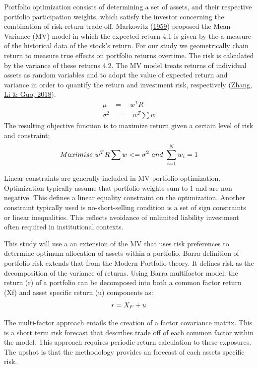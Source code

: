 \documentclass[12pt,preprint, authoryear]{elsarticle}
\numberwithin{equation}{section}
\numberwithin{figure}{section}
\numberwithin{table}{section}
\begin{document}
Portfolio optimization consists of determining a set of assets, and
their respective portfolio participation weights, which satisfy the
investor concerning the combination of risk-return trade-off. Markowitz
(\protect\hyperlink{ref-markowitz1959portfolio}{1959}) proposed the
Mean-Variance (MV) model in which the expected return 4.1 is given by
the a measure of the historical data of the stock's return. For our
study we geometrically chain return to measure true effects on portfolio
returns overtime. The risk is calculated by the variance of these
returns 4.2. The MV model treats returns of individual assets as random
variables and to adopt the value of expected return and variance in
order to quantify the return and investment risk, respectively
(\protect\hyperlink{ref-zhang2018portfolio}{Zhang, Li \& Guo, 2018}).
\begin{align}
 \mu \quad = \quad w^TR \\ 
\sigma^2 \quad  = \quad w^T\sum 
w\end{align} The resulting objective function is to maximize return
given a certain level of risk and constraint; \begin{align}
Maximise \ w^TR \sum w<=\sigma^2\ and\ \sum_{i = 1}^{N}w{_i}=1 \notag
\end{align}

Linear constraints are generally included in MV portfolio optimization.
Optimization typically assume that portfolio weights sum to 1 and are
non negative. This defines a linear equality constraint on the
optimization. Another constraint typically used is no-short-selling
condition is a set of sign constraints or linear inequalities. This
reflects avoidance of unlimited liability investment often required in
institutional contexts.

This study will use a an extension of the MV that uses risk preferences
to determine optimum allocation of assets within a portfolio. Barra
definition of portfolio risk extends that from the Modern Portfolio
theory. It defines risk as the decomposition of the variance of returns.
Using Barra multifactor model, the return (r) of a portfolio can be
decomposed into both a common factor return (Xf) and asset specific
return (u) components as: \begin{align} 
r= X_{F} + u \notag
\end{align}

The multi-factor approach entails the creation of a factor covariance
matrix. This is a short term risk forecast that describes trade off of
each common factor within the model. This approach requires periodic
return calculation to these exposures. The upshot is that the
methodology provides an forecast of each assets specific risk.
\end{document}
